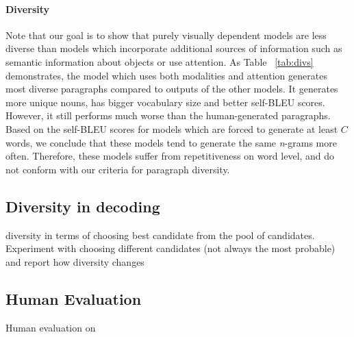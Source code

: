 \documentclass[11pt,a4paper]{article}
\begin{document}
\paragraph{Diversity}
Note that our goal is to show that purely visually dependent models are less diverse than models which incorporate additional sources of information such as semantic information about objects or use attention.
As Table ~\ref{tab:divs} demonstrates, the model which uses both modalities and attention generates most diverse paragraphs compared to outputs of the other models.
It generates more unique nouns, has bigger vocabulary size and better self-BLEU scores.
However, it still performs much worse than the human-generated paragraphs.
Based on the self-BLEU scores for models which are forced to generate at least $C$ words, we conclude that these models tend to generate the same \textit{n}-grams more often.
Therefore, these models suffer from repetitiveness on word level, and do not conform with our criteria for paragraph diversity.


\subsection{Diversity in decoding}
diversity in terms of choosing best candidate from the pool of candidates. Experiment with choosing different candidates (not always the most probable) and report how diversity changes

\subsection{Human Evaluation}
Human evaluation on 



\end{document}
